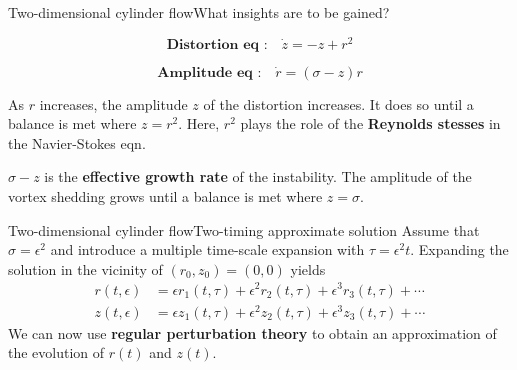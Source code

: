 \documentclass[usenames,dvipsnames,svgnames,10pt,aspectratio=169]{beamer}
\begin{document}
\begin{frame}[t, c]{Two-dimensional cylinder flow}{What insights are to be gained?}
  \begin{minipage}{.48\textwidth}
    \[
    \textbf{Distortion eq :} \quad \dot{z} = -z + r^2
    \]
  \end{minipage}%
  \hfill
  \begin{minipage}{.48\textwidth}
    \[
    \textbf{Amplitude eq :} \quad \dot{r} = \left( \sigma - z \right) r
    \]
  \end{minipage}

  \bigskip

  \begin{minipage}{.48\textwidth}
    As $r$ increases, the amplitude $z$ of the distortion increases.
    It does so until a balance is met where $z = r^2$.
    Here, $r^2$ plays the role of the \alert{\textbf{Reynolds stesses}} in the Navier-Stokes eqn.
  \end{minipage}%
  \hfill
  \begin{minipage}{.48\textwidth}
    $\sigma - z$ is the \alert{\textbf{effective growth rate}} of the instability.
    The amplitude of the vortex shedding grows until a balance is met where $z = \sigma$.
    \vspace{0.5cm}
  \end{minipage}

\end{frame}







\begin{frame}[t, c]{Two-dimensional cylinder flow}{Two-timing approximate solution}
  Assume that $\sigma = \epsilon^2$ and introduce a multiple time-scale expansion with $\tau = \epsilon^2 t$.
  Expanding the solution in the vicinity of $(r_0, z_0) = (0, 0)$ yields
  \[
  \begin{aligned}
    r(t, \epsilon) & = \epsilon r_1(t, \tau) + \epsilon^2 r_2(t, \tau) + \epsilon^3 r_3(t, \tau) + \cdots \\
    z(t, \epsilon) & = \epsilon z_1(t, \tau) + \epsilon^2 z_2(t, \tau) + \epsilon^3 z_3(t, \tau) + \cdots
  \end{aligned}
  \]
  We can now use \alert{\textbf{regular perturbation theory}} to obtain an approximation of the evolution of $r(t)$ and $z(t)$.
\end{frame}
\end{document}
